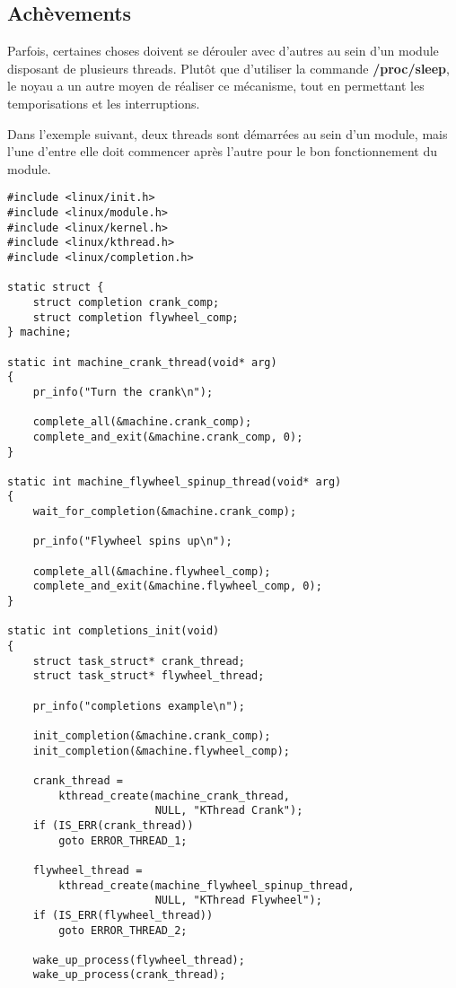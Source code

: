 \documentclass[11pt]{article}
\begin{document}
\subsection*{Achèvements}
\label{sec-11-2}

Parfois, certaines choses doivent se dérouler avec d'autres au sein d'un module disposant de plusieurs threads. Plutôt que d'utiliser la commande \textbf{/proc/sleep}, le noyau a un autre moyen de réaliser ce mécanisme, tout en permettant les temporisations et les interruptions.

Dans l'exemple suivant, deux threads sont démarrées au sein d'un module, mais l'une d'entre elle doit commencer après l'autre pour le bon fonctionnement du module.

\begin{verbatim}
#include <linux/init.h>
#include <linux/module.h>
#include <linux/kernel.h>
#include <linux/kthread.h>
#include <linux/completion.h>

static struct {
    struct completion crank_comp;
    struct completion flywheel_comp;
} machine;

static int machine_crank_thread(void* arg)
{
    pr_info("Turn the crank\n");

    complete_all(&machine.crank_comp);
    complete_and_exit(&machine.crank_comp, 0);
}

static int machine_flywheel_spinup_thread(void* arg)
{
    wait_for_completion(&machine.crank_comp);

    pr_info("Flywheel spins up\n");

    complete_all(&machine.flywheel_comp);
    complete_and_exit(&machine.flywheel_comp, 0);
}

static int completions_init(void)
{
    struct task_struct* crank_thread;
    struct task_struct* flywheel_thread;

    pr_info("completions example\n");

    init_completion(&machine.crank_comp);
    init_completion(&machine.flywheel_comp);

    crank_thread =
        kthread_create(machine_crank_thread,
                       NULL, "KThread Crank");
    if (IS_ERR(crank_thread))
        goto ERROR_THREAD_1;

    flywheel_thread =
        kthread_create(machine_flywheel_spinup_thread,
                       NULL, "KThread Flywheel");
    if (IS_ERR(flywheel_thread))
        goto ERROR_THREAD_2;

    wake_up_process(flywheel_thread);
    wake_up_process(crank_thread);


\end{verbatim}
\end{document}
